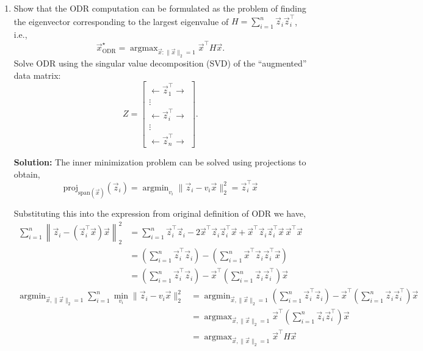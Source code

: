 \documentclass[10pt]{article}
\DeclareMathOperator*{\argmin}{argmin}
\DeclareMathOperator*{\argmax}{argmax}
\begin{document}
\begin{enumerate}[label=(\alph*), start=5]
\item Show that the ODR computation can be formulated as the problem of finding the eigenvector corresponding to the largest eigenvalue of $H = \sum_{i=1}^{n} \vec{z}_i \vec{z}_i^\top$, i.e.,
\begin{equation}
\vec{x}^\star_{\text{ODR}} = \argmax_{\vec{x}:\|\vec{x}\|_2=1} \vec{x}^\top H \vec{x}.
\end{equation}
Solve ODR using the singular value decomposition (SVD) of the ``augmented'' data matrix:
\begin{equation}
Z = \begin{bmatrix} \leftarrow \vec{z}_1^\top \rightarrow \\ \vdots \\ \leftarrow \vec{z}_i^\top \rightarrow \\ \vdots \\ \leftarrow \vec{z}_n^\top \rightarrow \end{bmatrix}.
\end{equation}

\textbf{Solution:} The inner minimization problem can be solved using projections to obtain,
\begin{equation}
\text{proj}_{\text{span}(\vec{x})}(\vec{z}_i) = \argmin_{v_i} \|\vec{z}_i - v_i \vec{x}\|_2^2 = \vec{z}_i^\top \vec{x}
\end{equation}

Substituting this into the expression from original definition of ODR we have,
\begin{align}
\sum_{i=1}^{n} \left\| \vec{z}_i - (\vec{z}_i^\top \vec{x})\vec{x} \right\|_2^2
&= \sum_{i=1}^{n} \vec{z}_i^\top \vec{z}_i - 2\vec{x}^\top \vec{z}_i \vec{z}_i^\top \vec{x} + \vec{x}^\top \vec{z}_i \vec{z}_i^\top \vec{x} \, \vec{x}^\top \vec{x} \\
&= \left( \sum_{i=1}^{n} \vec{z}_i^\top \vec{z}_i \right) - \left( \sum_{i=1}^{n} \vec{x}^\top \vec{z}_i \vec{z}_i^\top \vec{x} \right) \\
&= \left( \sum_{i=1}^{n} \vec{z}_i^\top \vec{z}_i \right) - \vec{x}^\top \left( \sum_{i=1}^{n} \vec{z}_i \vec{z}_i^\top \right) \vec{x}
\end{align}
\begin{align}
\argmin_{\vec{x},\|\vec{x}\|_2=1} \sum_{i=1}^{n} \min_{v_i} \|\vec{z}_i - v_i \vec{x}\|_2^2
&= \argmin_{\vec{x},\|\vec{x}\|_2=1} \left( \sum_{i=1}^{n} \vec{z}_i^\top \vec{z}_i \right) - \vec{x}^\top \left( \sum_{i=1}^{n} \vec{z}_i \vec{z}_i^\top \right) \vec{x} \\
&= \argmax_{\vec{x},\|\vec{x}\|_2=1} \vec{x}^\top \left( \sum_{i=1}^{n} \vec{z}_i \vec{z}_i^\top \right) \vec{x} \\
&= \argmax_{\vec{x},\|\vec{x}\|_2=1} \vec{x}^\top H \vec{x}
\end{align}


\end{enumerate}
\end{document}
